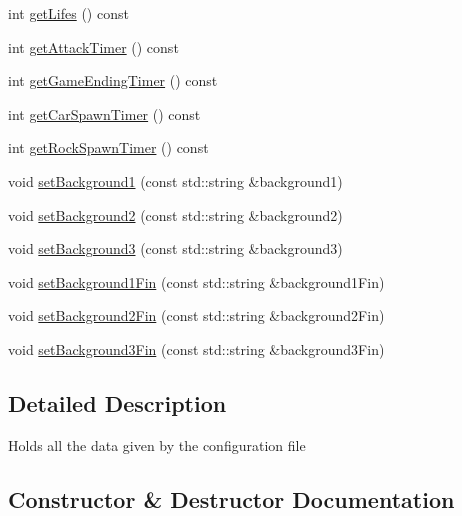 \begin{DoxyCompactItemize}
\item 
int \hyperlink{classConfigData_a90fb727b6f5583b2388a1c0bd853bc1a}{get\+Lifes} () const
\item 
int \hyperlink{classConfigData_ae73ba005cb7df3b2e9c38cb216324b05}{get\+Attack\+Timer} () const
\item 
int \hyperlink{classConfigData_a732dfa16f1cc3a38c734e7cef107300a}{get\+Game\+Ending\+Timer} () const
\item 
int \hyperlink{classConfigData_a482dbfc0bae40a9b690bdcafc9de1e9a}{get\+Car\+Spawn\+Timer} () const
\item 
int \hyperlink{classConfigData_a7decc7f3a25937fd169f2908b27c3565}{get\+Rock\+Spawn\+Timer} () const
\item 
void \hyperlink{classConfigData_a43959934e2e3a927e142203e637e327a}{set\+Background1} (const std\+::string \&background1)
\item 
void \hyperlink{classConfigData_a8502ce728edf1a3d835c5fcafe6d4e30}{set\+Background2} (const std\+::string \&background2)
\item 
void \hyperlink{classConfigData_a339eecd0d675c97642969024a2ab4ff5}{set\+Background3} (const std\+::string \&background3)
\item 
void \hyperlink{classConfigData_a9f242df86492feeae19aed291af32bd3}{set\+Background1\+Fin} (const std\+::string \&background1\+Fin)
\item 
void \hyperlink{classConfigData_aba02fb9632f972bd7359e8deca226b26}{set\+Background2\+Fin} (const std\+::string \&background2\+Fin)
\item 
void \hyperlink{classConfigData_ad2b64a90240c5f3d3b84f398c339a6b7}{set\+Background3\+Fin} (const std\+::string \&background3\+Fin)
\end{DoxyCompactItemize}


\subsection{Detailed Description}
Holds all the data given by the configuration file 

\subsection{Constructor \& Destructor Documentation}
\mbox{\label{classConfigData_ab5aa8113ed01a5d906c11cc722a34bf1}} 
